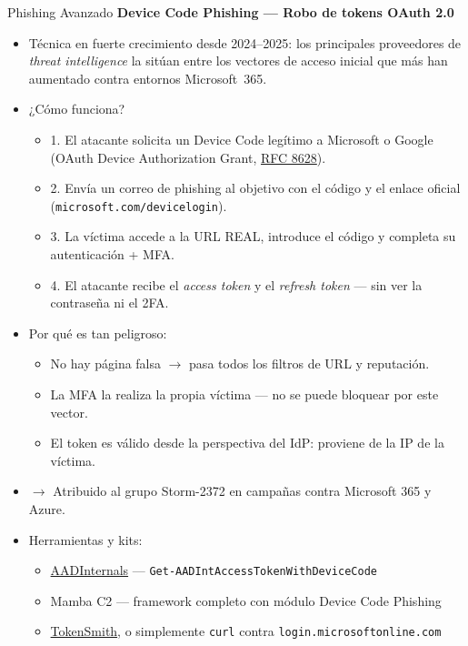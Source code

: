 \documentclass[aspectratio=169,11pt]{beamer}
\newcommand{\cmd}[1]{\texttt{\color{uznavy}#1}}
\newcommand{\term}[1]{\emph{#1}}
\newcommand{\lead}[1]{{\color{uznavy}\bfseries #1}\par\smallskip}
\begin{document}
\begin{frame}[allowframebreaks]{Phishing Avanzado}
\small
\lead{Device Code Phishing --- Robo de tokens OAuth 2.0}
  \begin{itemize}
  \item Técnica en fuerte crecimiento desde 2024--2025: los principales proveedores de \term{threat intelligence} la sitúan entre los vectores de acceso inicial que más han aumentado contra entornos Microsoft~365.
  \item ¿Cómo funciona?
    \begin{itemize}
    \item 1. El atacante solicita un Device Code legítimo a Microsoft o Google (OAuth Device Authorization Grant, \href{https://www.rfc-editor.org/rfc/rfc8628}{RFC 8628}).
    \item 2. Envía un correo de phishing al objetivo con el código y el enlace oficial (\cmd{microsoft.com/devicelogin}).
    \item 3. La víctima accede a la URL REAL, introduce el código y completa su autenticación + MFA.
    \item 4. El atacante recibe el \emph{access token} y el \emph{refresh token} --- sin ver la contraseña ni el 2FA.
    \end{itemize}
  \item Por qué es tan peligroso:
    \begin{itemize}
    \item No hay página falsa $\rightarrow$ pasa todos los filtros de URL y reputación.
    \item La MFA la realiza la propia víctima --- no se puede bloquear por este vector.
    \item El token es válido desde la perspectiva del IdP: proviene de la IP de la víctima.
    \end{itemize}
  \item $\rightarrow$ Atribuido al grupo Storm-2372 en campañas contra Microsoft 365 y Azure.
  \item Herramientas y kits:
    \begin{itemize}
    \item \href{https://aadinternals.com/}{AADInternals} --- \cmd{Get-AADIntAccessTokenWithDeviceCode}
    \item Mamba C2 --- framework completo con módulo Device Code Phishing
    \item \href{https://github.com/JumpsecLabs/TokenSmith}{TokenSmith}, o simplemente \cmd{curl} contra \cmd{login.microsoftonline.com}
    \end{itemize}

\end{itemize}
\end{frame}
\end{document}
